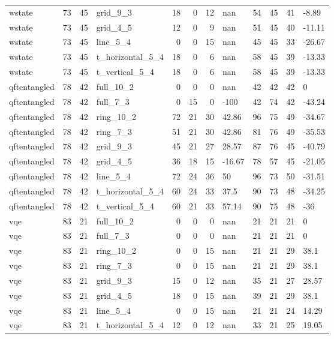 \begin{longtable}{lrrlrrrlrrrl}
wstate & 73 & 45 & grid\_9\_3 & 18 & 0 & 12 & nan & 54 & 45 & 41 & -8.89 \\
wstate & 73 & 45 & grid\_4\_5 & 12 & 0 & 9 & nan & 51 & 45 & 40 & -11.11 \\
wstate & 73 & 45 & line\_5\_4 & 0 & 0 & 15 & nan & 45 & 45 & 33 & -26.67 \\
wstate & 73 & 45 & t\_horizontal\_5\_4 & 18 & 0 & 6 & nan & 58 & 45 & 39 & -13.33 \\
wstate & 73 & 45 & t\_vertical\_5\_4 & 18 & 0 & 6 & nan & 58 & 45 & 39 & -13.33 \\
qftentangled & 78 & 42 & full\_10\_2 & 0 & 0 & 0 & nan & 42 & 42 & 42 & 0 \\
qftentangled & 78 & 42 & full\_7\_3 & 0 & 15 & 0 & -100 & 42 & 74 & 42 & -43.24 \\
qftentangled & 78 & 42 & ring\_10\_2 & 72 & 21 & 30 & 42.86 & 96 & 75 & 49 & -34.67 \\
qftentangled & 78 & 42 & ring\_7\_3 & 51 & 21 & 30 & 42.86 & 81 & 76 & 49 & -35.53 \\
qftentangled & 78 & 42 & grid\_9\_3 & 45 & 21 & 27 & 28.57 & 87 & 76 & 45 & -40.79 \\
qftentangled & 78 & 42 & grid\_4\_5 & 36 & 18 & 15 & -16.67 & 78 & 57 & 45 & -21.05 \\
qftentangled & 78 & 42 & line\_5\_4 & 72 & 24 & 36 & 50 & 96 & 73 & 50 & -31.51 \\
qftentangled & 78 & 42 & t\_horizontal\_5\_4 & 60 & 24 & 33 & 37.5 & 90 & 73 & 48 & -34.25 \\
qftentangled & 78 & 42 & t\_vertical\_5\_4 & 60 & 21 & 33 & 57.14 & 90 & 75 & 48 & -36 \\
vqe & 83 & 21 & full\_10\_2 & 0 & 0 & 0 & nan & 21 & 21 & 21 & 0 \\
vqe & 83 & 21 & full\_7\_3 & 0 & 0 & 0 & nan & 21 & 21 & 21 & 0 \\
vqe & 83 & 21 & ring\_10\_2 & 0 & 0 & 15 & nan & 21 & 21 & 29 & 38.1 \\
vqe & 83 & 21 & ring\_7\_3 & 0 & 0 & 15 & nan & 21 & 21 & 29 & 38.1 \\
vqe & 83 & 21 & grid\_9\_3 & 15 & 0 & 12 & nan & 35 & 21 & 27 & 28.57 \\
vqe & 83 & 21 & grid\_4\_5 & 18 & 0 & 15 & nan & 39 & 21 & 29 & 38.1 \\
vqe & 83 & 21 & line\_5\_4 & 0 & 0 & 15 & nan & 21 & 21 & 24 & 14.29 \\
vqe & 83 & 21 & t\_horizontal\_5\_4 & 12 & 0 & 12 & nan & 33 & 21 & 25 & 19.05 \\

\end{longtable}

